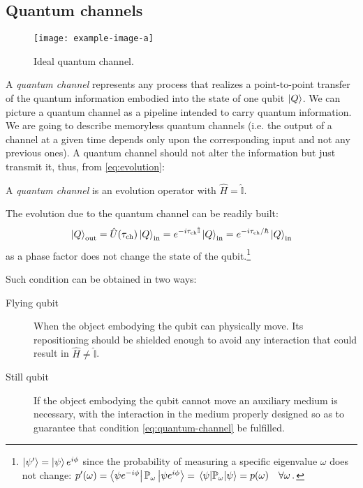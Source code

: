 \subsection{Quantum channels}
\begin{figure}[htb]
\centering
\texttt{[image: example-image-a]}
\caption{Ideal quantum channel.}
\label{fig:quantum-channel}
\end{figure}
A \emph{quantum channel} represents any process that realizes a point-to-point transfer of the quantum information embodied into the state of one qubit $\ket{Q}$. We can picture a quantum channel as a pipeline intended to carry quantum information. We are going to describe memoryless quantum channels (i.e. the output of a channel at a given time depends only upon the corresponding input and not any previous ones).
A quantum channel should not alter the information but just transmit it, thus, from \eqref{eq:evolution}:
\begin{defn}
A \emph{quantum channel} is an evolution operator with $\hat{H}=\hat{\mathbb{I}}$.
\end{defn}
The evolution due to the quantum channel can be readily built:
\begin{equation}\label{eq:quantum-channel}
    \ket{Q}_\textup{out} = \hat{U}(\tau_\textup{ch}) \ket{Q}_\textup{in} = e^{-i\tau_\textup{ch}\hat{\mathbb{I}}} \ket{Q}_\textup{in} = e^{-i\tau_\textup{ch}/\hbar} \ket{Q}_\textup{in}
\end{equation}
as a phase factor does not change the state of the qubit.\footnote{$\ket{\psi'}= \ket{\psi}e^{i\phi}$ since the probability of measuring a specific eigenvalue $\omega$ does not change: $p'(\omega) = \bra{\psi e^{-i\phi}}\mathbb{P}_\omega\ket{\psi e^{i\phi}} = \expval{\mathbb{P}_\omega}{\psi} = p(\omega) \quad \forall \omega\,.$}

Such condition can be obtained in two ways:
\begin{description}
\item[Flying qubit] When the object embodying the qubit can physically move. Its repositioning should be shielded enough to avoid any interaction that could result in $\hat{H} \neq \hat{\mathbb{I}}$.
\item[Still qubit] If the object embodying the qubit cannot move an auxiliary medium is necessary, with the interaction in the medium properly designed so as to guarantee that condition \eqref{eq:quantum-channel} be fulfilled.
\end{description}

